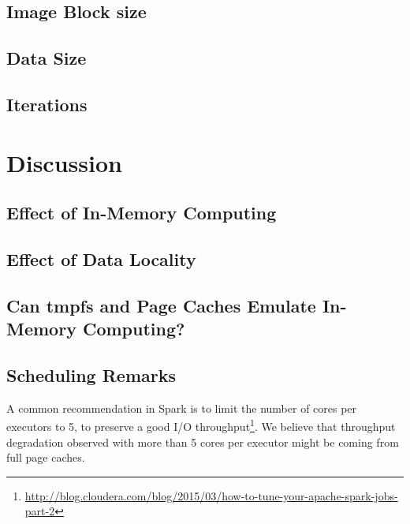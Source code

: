 \documentclass{IEEEtran}
\begin{document}
\subsection{Image Block size}

\subsection{Data Size}

\subsection{Iterations}


\section{Discussion} %
\label{sec:discussion}
\subsection{Effect of In-Memory Computing}

\subsection{Effect of Data Locality}


\subsection{Can tmpfs and Page Caches Emulate In-Memory Computing?}


\subsection{Scheduling Remarks}


A common recommendation in Spark is to limit the number of cores per 
executors to 5, to preserve a good I/O 
throughput\footnote{\url{http://blog.cloudera.com/blog/2015/03/how-to-tune-your-apache-spark-jobs-part-2}}. 
We believe that throughput degradation observed with more than 5 cores 
per executor might be coming from full page caches.
\end{document}
